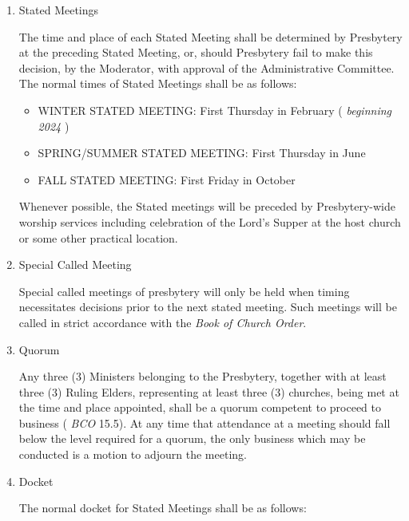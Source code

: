 \documentclass[
]{book}
\providecommand{\tightlist}{%
  \setlength{\itemsep}{0pt}\setlength{\parskip}{0pt}}
\begin{document}
\begin{enumerate}
\def\labelenumi{\Alph{enumi}.}
\item
  Stated Meetings

  The time and place of each Stated Meeting shall be determined by Presbytery at the preceding Stated Meeting, or, should Presbytery fail to make this decision, by the Moderator, with approval of the Administrative Committee. The normal times of Stated Meetings shall be as follows:

  \begin{itemize}
  \tightlist
  \item
    WINTER STATED MEETING: First Thursday in February ( \emph{beginning 2024} )
  \item
    SPRING/SUMMER STATED MEETING: First Thursday in June
  \item
    FALL STATED MEETING: First Friday in October
  \end{itemize}

  Whenever possible, the Stated meetings will be preceded by Presbytery-wide worship services including celebration of the Lord's Supper at the host church or some other practical location.
\item
  Special Called Meeting

  Special called meetings of presbytery will only be held when timing necessitates decisions prior to the next stated meeting. Such meetings will be called in strict accordance with the \emph{Book of Church Order}.
\item
  Quorum

  Any three (3) Ministers belonging to the Presbytery, together with at least three (3) Ruling Elders, representing at least three (3) churches, being met at the time and place appointed, shall be a quorum competent to proceed to business ( \emph{BCO} 15.5). At any time that attendance at a meeting should fall below the level required for a quorum, the only business which may be conducted is a motion to adjourn the meeting.
\item
  Docket

  The normal docket for Stated Meetings shall be as follows:


\end{enumerate}
\end{document}
